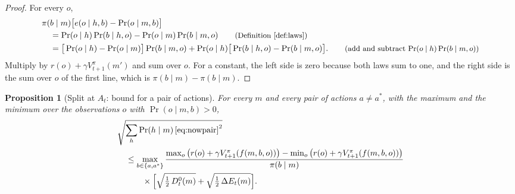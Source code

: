 \documentclass{article}
\newtheorem{proposition}{Proposition}[section]
\theoremstyle{definition}
\numberwithin{equation}{section}
\newcommand{\dE}{\Delta E}
\newcommand{\why}[1]{\tag*{\small(#1)}}
\begin{document}
\begin{proof}
For every $o$,
\begin{align*}
&\pi(b\mid m)\big[e(o\mid h,b)-\Pr(o\mid m,b)\big]\\
&\quad=\Pr(o\mid h)\Pr(b\mid h,o)-\Pr(o\mid m)\Pr(b\mid m,o) \why{Definition~\ref{def:laws}}\\
&\quad=\big[\Pr(o\mid h)-\Pr(o\mid m)\big]\Pr(b\mid m,o)+\Pr(o\mid h)\big[\Pr(b\mid h,o)-\Pr(b\mid m,o)\big]. \why{add and subtract $\Pr(o\mid h)\Pr(b\mid m,o)$}
\end{align*}
Multiply by $r(o)+\gamma V^\pi_{t+1}(m')$ and sum over $o$. For a constant, the left side is zero because both laws sum to one, and the right side is the sum over $o$ of the first line, which is $\pi(b\mid m)-\pi(b\mid m)$.
\end{proof}

\begin{proposition}[Split at $A_t$: bound for a pair of actions]\label{prop:bound1}
For every $m$ and every pair of actions $a\ne a^*$, with the maximum and the minimum over the observations $o$ with $\Pr(o\mid m,b)>0$,
\begin{align*}
&\sqrt{\sum_h\Pr(h\mid m)\,\eqref{eq:nowpair}^2}\\
&\quad\le\max_{b\in\{a,a^*\}}\frac{\max_o\big(r(o)+\gamma V^\pi_{t+1}(f(m,b,o))\big)-\min_o\big(r(o)+\gamma V^\pi_{t+1}(f(m,b,o))\big)}{\pi(b\mid m)}\\
&\qquad\quad\times\Big[\sqrt{\tfrac12\,D^0_t(m)}+\sqrt{\tfrac12\,\dE_t(m)}\Big].
\end{align*}
\end{proposition}
\end{document}
